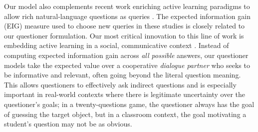 \documentclass[12pt, floatsintext, jou]{apa6}
\begin{document}

Our model also complements recent work enriching active learning paradigms to allow rich natural-language questions as queries \cite{RotheEtAl16_NaturalLanguageQuestions, CohenLake16_20Q}. The expected information gain (EIG) measure used to choose new queries in these studies is closely related to our questioner formulation. Our most critical innovation to this line of work is embedding active learning in a social, communicative context \cite<see also>{ShaftoGoodmanFrank12_LearningFromOthers, ShaftoGoodmanGriffiths14_Pedagogical}. Instead of computing expected information gain across \emph{all possible} answers, our questioner models take the expected value over a cooperative \emph{dialogue partner} who seeks to be informative and relevant, often going beyond the literal question meaning. This allows questioners to effectively ask indirect questions and is especially important in real-world contexts where there is legitimate uncertainty over the questioner's goals; in a twenty-questions game, the questioner always has the goal of guessing the target object, but in a classroom context, the goal motivating a student's question may not be as obvious. 
\end{document}
